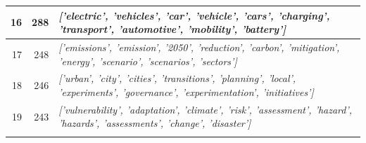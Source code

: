 \documentclass[12pt]{article}
\begin{document}
\begin{landscape}
\begin{table}[]
\begin{tabular}{rrl}
\multicolumn{1}{|r|}{16}             & \multicolumn{1}{r|}{288}            & \multicolumn{1}{l|}{\textit{{[}'electric', 'vehicles', 'car', 'vehicle', 'cars', 'charging', 'transport', 'automotive', 'mobility', 'battery'{]}}}                                   \\ \hline
\multicolumn{1}{|r|}{17}             & \multicolumn{1}{r|}{248}            & \multicolumn{1}{l|}{\textit{{[}'emissions', 'emission', '2050', 'reduction', 'carbon', 'mitigation', 'energy', 'scenario', 'scenarios', 'sectors'{]}}}                               \\ \hline
\multicolumn{1}{|r|}{18}             & \multicolumn{1}{r|}{246}            & \multicolumn{1}{l|}{\textit{{[}'urban', 'city', 'cities', 'transitions', 'planning', 'local', 'experiments', 'governance', 'experimentation', 'initiatives'{]}}}                     \\ \hline
\multicolumn{1}{|r|}{19}             & \multicolumn{1}{r|}{243}            & \multicolumn{1}{l|}{\textit{{[}'vulnerability', 'adaptation', 'climate', 'risk', 'assessment', 'hazard', 'hazards', 'assessments', 'change', 'disaster'{]}}}                         \\ \hline
\multicolumn{1}{l}{}                 & \multicolumn{1}{l}{}                &                                                                                                                                                                                     
\end{tabular}
\end{table}
\end{landscape}
\end{document}
